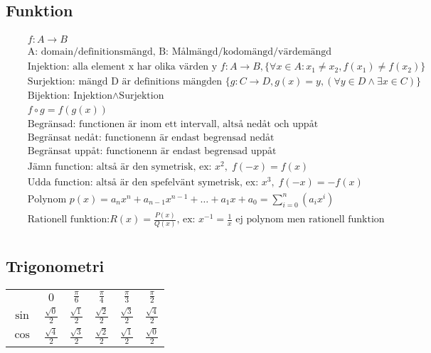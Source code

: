 \subsection{Funktion}
\begin{align*}
  &\quad  f: A \to B \\
  &\quad  \text{A: domain/definitionsmängd, B: Målmängd/kodomängd/värdemängd} \\
  &\quad  \text{Injektion: alla element x har olika värden y } f: A \to B,
  \{{\forall x \in A: x_1 \neq x_2, f(x_1) \neq f(x_2)}\} \\
  &\quad  \text{Surjektion: mängd D är definitions mängden } \{g: C \to D, g(x)=y,
  (\forall y \in D \land \exists x \in C)\} \\
  &\quad  \text{Bijektion: } \text{Injektion} \land \text{Surjektion}  \\
  &\quad  f \circ g = f(g(x)) \\
  &\quad  \text{Begränsad: functionen är inom ett intervall, altså nedåt och uppåt} \\
  &\quad  \text{Begränsat nedåt: functionenn är endast begrensad nedåt} \\
  &\quad  \text{Begränsat uppåt: functionenn är endast begrensad uppåt} \\
  &\quad  \text{Jämn function: altså är den symetrisk, ex: } x^2, \; f(-x)=f(x) \\
  &\quad  \text{Udda function: altså är den spefelvänt symetrisk, ex: } x^3, \; f(-x)=-f(x) \\
  &\quad  \text{Polynom } p(x)=a_nx^n +a_{n-1}x^{n-1}+ \ldots +a_1x +a_0
  = \displaystyle\sum _ { i=0 } ^ { n } (a_i x^{i}) \\
  &\quad  \text{Rationell funktion:} R(x)=\frac{P(x)}{Q(x)} \text{, ex: } x^{-1}
  =\frac{1}{x} \text{ ej polynom men rationell funktion} \\
\end{align*}


\newpage

\subsection{Trigonometri}
\begin{center}
\begin{tabular}{ |c|c|c|c|c|c| } 
 \hline
        & $0$                  & $\frac{\pi}{6}$      & $\frac{\pi}{4}$      & $\frac{\pi}{3}$    & $\frac{\pi}{2}$ \\ 
 $\sin$ & $\frac{\sqrt{0}}{2}$ & $\frac{\sqrt{1}}{2}$ & $\frac{\sqrt{2}}{2}$ & $\frac{\sqrt{3}}{2}$ & $\frac{\sqrt{4}}{2}$ \\ 
 $\cos$ & $\frac{\sqrt{4}}{2}$ & $\frac{\sqrt{3}}{2}$ & $\frac{\sqrt{2}}{2}$ & $\frac{\sqrt{1}}{2}$ & $\frac{\sqrt{0}}{2}$ \\  
 \hline
\end{tabular}
\end{center}


